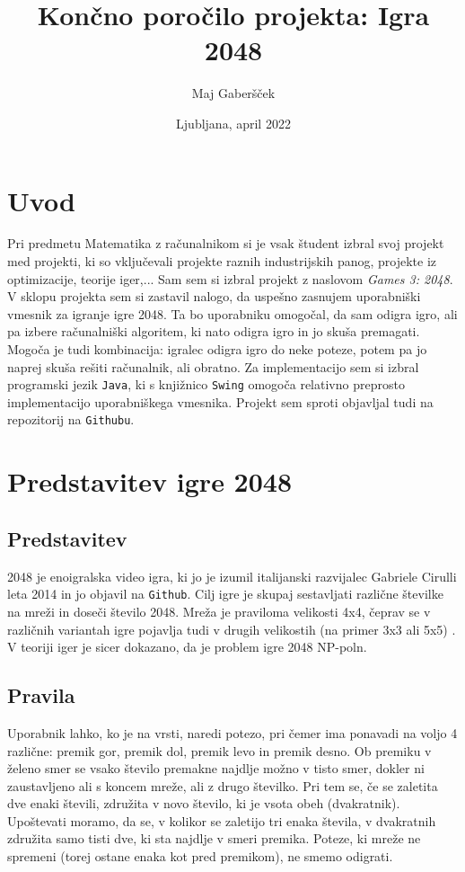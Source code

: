 \documentclass{article}
\title{Končno poročilo projekta: Igra 2048}
\author{Maj Gaberšček}
\date{Ljubljana, april 2022}
\begin{document}
\maketitle

\section{Uvod}
Pri predmetu Matematika z računalnikom si je vsak študent izbral svoj projekt med projekti, ki so vključevali projekte raznih industrijskih panog, projekte iz optimizacije, teorije iger,... Sam sem si izbral projekt z naslovom \emph{Games 3: 2048}. V sklopu projekta sem si zastavil nalogo, da uspešno zasnujem uporabniški vmesnik za igranje igre 2048. Ta bo uporabniku omogočal, da sam odigra igro, ali pa izbere računalniški algoritem, ki nato odigra igro in jo skuša premagati. Mogoča je tudi kombinacija: igralec odigra igro do neke poteze, potem pa jo naprej skuša rešiti računalnik, ali obratno. Za implementacijo sem si izbral programski jezik \texttt{Java}, ki s knjižnico \texttt{Swing} omogoča relativno preprosto implementacijo uporabniškega vmesnika. Projekt sem sproti objavljal tudi na repozitorij na \texttt{Githubu}.

\section{Predstavitev igre 2048}

\subsection{Predstavitev}

2048 je enoigralska video igra, ki jo je izumil italijanski razvijalec Gabriele Cirulli leta 2014 in jo objavil na \texttt{Github}. Cilj igre je skupaj sestavljati različne številke na mreži in doseči število 2048. Mreža je praviloma velikosti 4x4, čeprav se v različnih variantah igre pojavlja tudi v drugih velikostih (na primer 3x3 ali 5x5) \cite{wiki:2048_(video_game)}. V teoriji iger je sicer dokazano, da je problem igre 2048 NP-poln.\cite{DBLP:journals/corr/AbdelkaderAD15}

\subsection{Pravila}

Uporabnik lahko, ko je na vrsti, naredi potezo, pri čemer ima ponavadi na voljo 4 različne: premik gor, premik dol, premik levo in premik desno. Ob premiku v želeno smer se vsako število premakne najdlje možno v tisto smer, dokler ni zaustavljeno ali s koncem mreže, ali z drugo številko. Pri tem se, če se zaletita dve enaki števili, združita v novo število, ki je vsota obeh (dvakratnik). Upoštevati moramo, da se, v kolikor se zaletijo tri enaka števila, v dvakratnih združita samo tisti dve, ki sta najdlje v smeri premika. Poteze, ki mreže ne spremeni (torej ostane enaka kot pred premikom), ne smemo odigrati.
\end{document}
